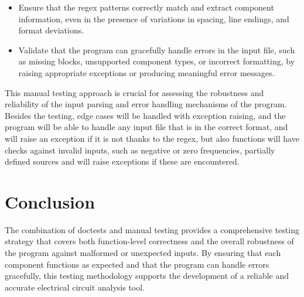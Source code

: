 \documentclass[a4paper]{article}
\begin{document}
\begin{itemize}
    \item Ensure that the regex patterns correctly match and extract component information, even in the presence of variations in spacing, line endings, and format deviations.
    \item Validate that the program can gracefully handle errors in the input file, such as missing blocks, unsupported component types, or incorrect formatting, by raising appropriate exceptions or producing meaningful error messages.
\end{itemize}

This manual testing approach is crucial for assessing the robustness and reliability of the input parsing and error handling mechanisms of the program.\\

Besides the testing, edge cases will be handled with exception raising, and the program will be able to handle any input file that is in the correct format, and will raise an exception if it is not thanks to the regex, but also functions will
have checks against invalid inputs, such as negative or zero frequencies, partially defined sources and will raise exceptions if these are encountered.

\section{Conclusion}
The combination of doctests and manual testing provides a comprehensive testing strategy that
 covers both function-level correctness and the overall robustness of the 
 program against malformed or unexpected inputs. By ensuring that each component 
 functions as expected and that the program can handle errors gracefully, this 
 testing methodology supports the development of a reliable and accurate
  electrical circuit analysis tool.
\end{document}
